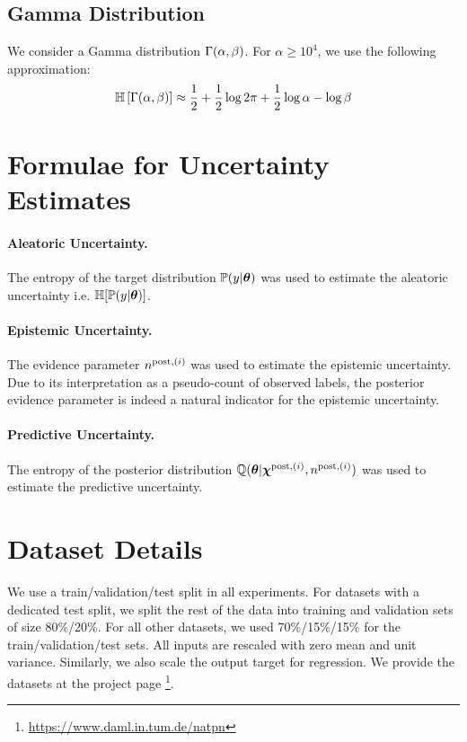 \subsection{Gamma Distribution}

We consider a Gamma distribution $\operatorname{\Gamma}(\alpha, \beta)$. For $\alpha \ge 10^4$, we use the following approximation:
\begin{equation}
    \operatorname{\mathbb{H}}\left[\operatorname{\Gamma}(\alpha, \beta)\right] \approx \frac{1}{2} + \frac{1}{2} \log{2\pi} + \frac{1}{2} \log{\alpha} - \log{\beta}
\end{equation}


\section{Formulae for Uncertainty Estimates}

\paragraph{Aleatoric Uncertainty.} The entropy of the target distribution $\mathbb{P}(y | \bm{\theta})$ was used to estimate the aleatoric uncertainty i.e. $\operatorname{\mathbb{H}}[\mathbb{P}(y | \bm{\theta})]$.

\paragraph{Epistemic Uncertainty.} The evidence parameter $n^{\text{post}, (i)}$ was used to estimate the epistemic uncertainty. Due to its interpretation as a pseudo-count of observed labels, the posterior evidence parameter is indeed a natural indicator for the epistemic uncertainty.

\paragraph{Predictive Uncertainty.} The entropy of the posterior distribution $\operatorname{\mathbb{Q}}(\bm{\theta}|\bm{\chi}^{\text{post}, (i)}, n^{\text{post}, (i)})$ was used to estimate the predictive uncertainty.

\section{Dataset Details}
\label{sec:dataset}

We use a train/validation/test split in all experiments. For datasets with a dedicated test split, we split the rest of the data into training and validation sets of size 80\%/20\%. For all other datasets, we used 70\%/15\%/15\% for the train/validation/test sets. All inputs are rescaled with zero mean and unit variance. Similarly, we also scale the output target for regression. We provide the datasets at the project page \footnote{\url{https://www.daml.in.tum.de/natpn}}.

